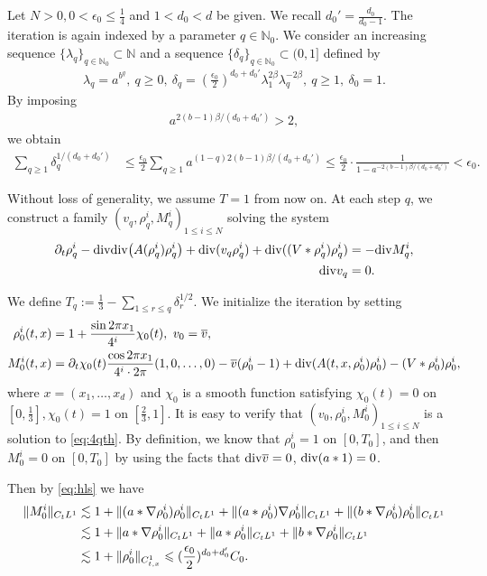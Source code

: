 \documentclass[UTF-8,reqno]{amsart}
\numberwithin{equation}{section}
\theoremstyle{definition}
\def\geq{\geqslant}
\def\leq{\leqslant}
\def\div{\mathord{{\rm div}}}
\def\geq{\geqslant}
\def\leq{\leqslant}
\def\div{\mathord{{\rm div}}}
\begin{document}
Let $N>0,0<\epsilon_0\leq \frac14$ and $1<d_0<d$ be given. We recall $d_0'=\frac{d_0}{d_0-1}$. The iteration is again indexed by a parameter
$
q\in\mathbb{N}_0.
$
We consider an increasing sequence
$
\{\lambda_q\}_{q\in\mathbb{N}_0}\subset\mathbb{N}
$
and a sequence
$
\{\delta_q\}_{q\in\mathbb{N}_0}\subset(0,1]
$
defined  by \begin{align*}
\lambda_q
=
a^{b^q},
\ 
q\geq0,
\ 
\delta_q
=
(\frac{\epsilon_0}{2})^{d_0+d_0'}
\lambda_1^{2\beta}
\lambda_q^{-2\beta},
\ 
q\geq1,
\ 
\delta_0=1.
\end{align*} By imposing
\begin{align}
a^{2(b-1)\beta/(d_0+d_0')}>2,
\label{ieq:6ab2}
\end{align}
we obtain
\begin{align*}
\sum_{q\geq1}\delta_q^{1/(d_0+d_0')}
&\leq
\frac{\epsilon_0}{2} 
\sum_{q\geq1}
a^{(1-q)2(b-1)\beta/(d_0+d_0')}\leq
\frac{\epsilon_0}{2}
\cdot
\frac1{1-a^{-2(b-1)\beta/(d_0+d_0')}}
<
\epsilon_0.
\end{align*}
 
 

Without loss of generality, we assume $T=1$ from now on. 
At each step $q$, we construct a family
$(v_q,\rho_q^i,M_q^i)_{1\leq i\leq {N}}$
solving the system
\begin{align}\label{eq:6qth}
\partial_t\rho_q^i
-
\div\div\bigl(A(\rho_q^i)\rho_q^i\bigr)
+
\div(v_q\rho_q^i)+\div((V*\rho_q^i)\rho_q^i)
&=
-\div M_q^i,
\\
\div v_q&=0.
\notag
\end{align} 

We define 
$
T_q:=\frac13-\sum_{1\leq r\leq q}\delta_r^{1/2}.
$ 
We initialize the iteration by setting
\begin{align*}
\rho_0^i(t,x)
&=
1+\frac{\sin2\pi x_1}{4^i}\chi_0(t),
 \ 
v_0=\overline v,\\
M_0^i(t,x)
&=
\partial_t\chi_0(t)\frac{\cos2\pi x_1}{4^i\cdot 2\pi}(1,0,\dots,0)
-\overline v(\rho_0^i-1)  +
\div( A(t,x,\rho_0^i) \rho_0^i)-(V*\rho_0^i)\rho_0^i,
\end{align*}
where $x=(x_1,\dots,x_d)$ and $\chi_0$ is a smooth function satisfying
$
\chi_0(t)=0 $ on $
 [0,\frac13 ], \chi_0(t)=1$ on $[\frac23,1 ].
$   It is easy to verify that $(v_0,\rho^{i}_0,  M^{i}_0)_{1\leq i\leq N}$ is a solution to \eqref{eq:4qth}.   By definition, we know that $\rho_0^i=1$ on $[0,T_0]$, and then $M_0^i=0$ on $[0,T_0]$  by using the facts that $\div \overline v=0$, $\div(a*1)=0$.

Then by \eqref{eq:hls}  we have 
\begin{align}
    \| M^i_0\|_{C_tL^1}&\lesssim 1+\|(a*\nabla \rho_0^i)\rho_0^i\|_{C_tL^1}+\|(a*
\rho^i_0)\nabla \rho^i_0\|_{C_tL^1}+\|(b*
\nabla\rho^i_0) \rho^i_0\|_{C_tL^1}\notag\\
&\lesssim 1+\|a*\nabla \rho_0^i\|_{C_tL^1}+\|a*
\rho^i_0\|_{C_tL^1}+\|b*\nabla
\rho^i_0\|_{C_tL^1}\notag\\
&\lesssim 1+\|\rho^i_0\|_{C_{t,x}^1}\leq
(\frac{\epsilon_0}{2})^{d_0+d_0'}C_0.\label{bd:6rho_0,M_02}
 \end{align}
 
\end{document}
